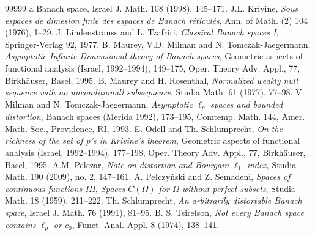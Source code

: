 \documentclass[a4paper]{amsart}
\theoremstyle{plain}
\begin{document}
\begin{thebibliography}{99999}
{a Banach space}, Israel J. Math. 108 (1998), 145--171.
 J.L. Krivine, {\sl Sous espaces de dimesion finie des espaces de
Banach r\'eticul\'es}, Ann. of Math. (2) 104 (1976), 1--29.
 J. Lindenstrauss and L. Tzafriri,
{\sl Classical Banach spaces I}, Springer-Verlag 92, 1977.
 B. Maurey, V.D. Milman and N. Tomczak-Jaegermann, {\sl Asymptotic
Infinite-Dimensional theory of Banach spaces}, Geometric aspects of functional analysis (Israel, 1992--1994),  149--175, Oper. Theory Adv. Appl., 77, Birkh\"auser, Basel, 1995.
 B. Maurey  and H. Rosenthal, {\sl Normalized weakly null sequence with no unconditionall subsequence}, Studia Math. 61 (1977), 77--98.
 V. Milman and N. Tomczak-Jaegermann, {\sl Asymptotic $\ell_p$
spaces and bounded distortion}, Banach spaces (Merida
1992), 173--195, Comtemp. Math. 144, Amer. Math. Soc., Providence, RI, 1993.
 E. Odell and Th. Schlumprecht, {\sl On the richness of the set of
p's in Krivine's theorem},  Geometric aspects of functional analysis (Israel, 1992--1994),  177--198, Oper. Theory Adv. Appl., 77, Birkh\"auser, Basel, 1995.
 A.M. Pelczar, {\sl Note on distortion and Bourgain $\ell_{1}$-index},
Studia Math. 190 (2009), no. 2, 147--161.
 A. Pe{\l}czy\'nski and Z. Semadeni, {\sl Spaces of continuous
functions III, Spaces $C(\Omega)$ for $\Omega$ without perfect subsets}, Studia
Math. 18 (1959), 211--222.
 {\rm Th. Schlumprecht}, {\sl An arbitrarily distortable Banach
space}, Israel J. Math. 76 (1991), 81--95.
 B. S. Tsirelson, {\sl Not every Banach space contains  $\ell _{p}$
or $c_{0}$}, Funct. Anal. Appl.  8 (1974), 138--141.
\end{thebibliography}
\end{document}
